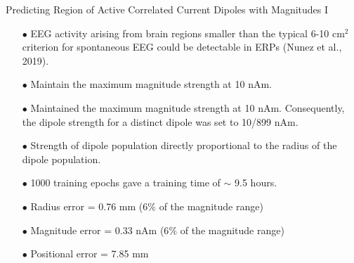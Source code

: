 \documentclass[aspectratio=169, 9pt]{beamer}
\begin{document}
\begin{frame}{Predicting Region of Active Correlated Current Dipoles with Magnitudes I}
      \begin{itemize}
          \item[$\bullet$] EEG activity arising from brain regions smaller than the typical 6-10 cm$^2$ criterion for spontaneous EEG could be detectable in ERPs (Nunez et al., 2019).
          \item[$\bullet$] Maintain the maximum magnitude strength at 10 nAm.
          \item[$\bullet$] Maintained the maximum magnitude strength at 10 nAm. Consequently, the dipole strength for a distinct dipole was set to 10/899 nAm.
          \item[$\bullet$] Strength of dipole population directly proportional to the radius of the dipole population.
          \item[$\bullet$] 1000 training epochs gave a training time of $\sim$ 9.5 hours.
          \item[$\bullet$] Radius error = 0.76 mm (6$\%$ of the magnitude range)
          \item[$\bullet$] Magnitude error = 0.33 nAm (6$\%$ of the magnitude range)
          \item[$\bullet$] Positional error = 7.85 mm


\end{itemize}
\end{frame}
\end{document}
